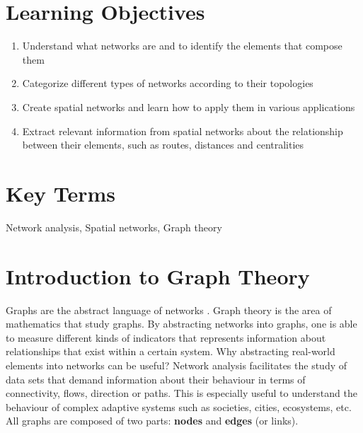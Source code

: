 \documentclass[
]{book}
\providecommand{\tightlist}{%
  \setlength{\itemsep}{0pt}\setlength{\parskip}{0pt}}
\begin{document}
\hypertarget{learning-objectives-7}{%
\section*{Learning Objectives}\label{learning-objectives-7}}

\begin{enumerate}
\def\labelenumi{\arabic{enumi}.}
\tightlist
\item
  Understand what networks are and to identify the elements that compose them
\item
  Categorize different types of networks according to their topologies
\item
  Create spatial networks and learn how to apply them in various applications
\item
  Extract relevant information from spatial networks about the relationship between their elements, such as routes, distances and centralities
\end{enumerate}

\hypertarget{key-terms-7}{%
\section*{Key Terms}\label{key-terms-7}}

Network analysis, Spatial networks, Graph theory

\hypertarget{introduction-to-graph-theory}{%
\section{Introduction to Graph Theory}\label{introduction-to-graph-theory}}

Graphs are the abstract language of networks \citep{systems_innovation_graph_2015}. Graph theory is the area of mathematics that study graphs. By abstracting networks into graphs, one is able to measure different kinds of indicators that represents information about relationships that exist within a certain system. Why abstracting real-world elements into networks can be useful? Network analysis facilitates the study of data sets that demand information about their behaviour in terms of connectivity, flows, direction or paths. This is especially useful to understand the behaviour of complex adaptive systems such as societies, cities, ecosystems, etc. All graphs are composed of two parts: \textbf{nodes} and \textbf{edges} (or links).
\end{document}
